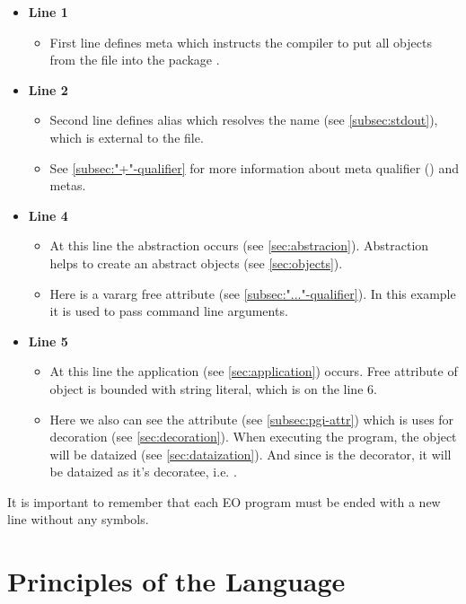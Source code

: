 \documentclass[12pt]{book}
\begin{document}
\begin{itemize}
    \item \textbf{Line 1}
    \begin{itemize}
        \item First line defines  meta which instructs the compiler to put all objects from the ﬁle into the package .
    \end{itemize}
    \item  \textbf{Line 2}
    \begin{itemize}
        \item Second line defines alias which resolves the name
         (see \ref{subsec:stdout}), which is external to the ﬁle.
        \item See \ref{subsec:"+"-qualifier} for more information about meta qualifier (\ff{+}) and metas.
    \end{itemize}
    \item \textbf{Line 4}
    \begin{itemize}
        \item At this line the abstraction occurs (see \ref{sec:abstracion}). Abstraction helps to create an abstract objects (see \ref{sec:objects}). 
        \item Here  is a vararg free attribute (see \ref{subsec:"..."-qualifier}). In this example it is used to pass command line arguments.
    \end{itemize}
    \item \textbf{Line 5}
    \begin{itemize}
        \item At this line the application (see \ref{sec:application}) occurs. Free attribute of  object is bounded with  string literal, which is on the line 6. 
        \item Here we also can see the  attribute (see \ref{subsec:pgi-attr}) which is uses for decoration (see \ref{sec:decoration}). When executing the program, the  object will be dataized (see \ref{sec:dataization}). And since  is the decorator, it will be dataized as it's decoratee, i.e. .
    \end{itemize}
\end{itemize}

It is important to remember that each EO program must be ended with a new line without any symbols.

\chapter{Principles of the Language}
\end{document}
